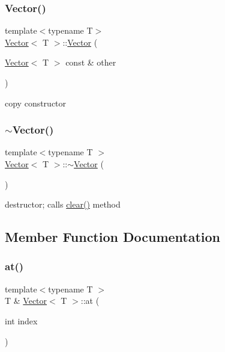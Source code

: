 \subsubsection{\texorpdfstring{Vector()}{Vector()}\hspace{0.1cm}{\footnotesize\ttfamily [3/3]}}
{\footnotesize\ttfamily template$<$typename T$>$ \\
\hyperlink{classVector}{Vector}$<$ T $>$\+::\hyperlink{classVector}{Vector} (\begin{DoxyParamCaption}\item[{\hyperlink{classVector}{Vector}$<$ T $>$ const \&}]{other }\end{DoxyParamCaption})}



copy constructor 

\mbox{\label{classVector_afd524fac19e6d3d69db5198ffe2952b0}} 
\subsubsection{\texorpdfstring{$\sim$\+Vector()}{~Vector()}}
{\footnotesize\ttfamily template$<$typename T $>$ \\
\hyperlink{classVector}{Vector}$<$ T $>$\+::$\sim$\hyperlink{classVector}{Vector} (\begin{DoxyParamCaption}{ }\end{DoxyParamCaption})}



destructor; calls \hyperlink{classVector_a32ad98b135472b0ebc5d6cb3ae5d0085}{clear()} method 



\subsection{Member Function Documentation}
\mbox{\label{classVector_a0a53d8de64ae7cc1e388df4e46ab06bf}} 
\subsubsection{\texorpdfstring{at()}{at()}\hspace{0.1cm}{\footnotesize\ttfamily [1/2]}}
{\footnotesize\ttfamily template$<$typename T $>$ \\
T \& \hyperlink{classVector}{Vector}$<$ T $>$\+::at (\begin{DoxyParamCaption}\item[{int}]{index }\end{DoxyParamCaption})}

